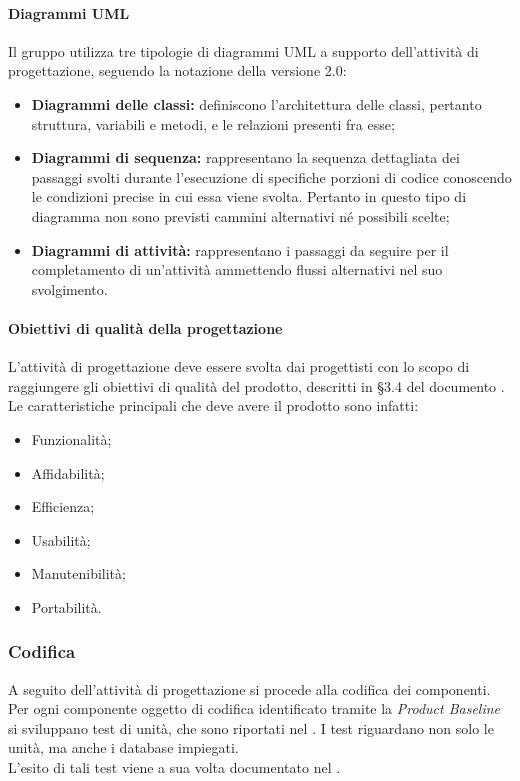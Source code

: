 \paragraph{Diagrammi UML}
Il gruppo \groupName{} utilizza tre tipologie di diagrammi UML a supporto dell'attivit\`a di progettazione, seguendo la notazione della versione 2.0:
\begin{itemize}
	\item \textbf{Diagrammi delle classi:} definiscono l'architettura delle classi, pertanto struttura, variabili e metodi, e le relazioni presenti fra esse;
	\item \textbf{Diagrammi di sequenza:} rappresentano la sequenza dettagliata dei passaggi svolti durante l'esecuzione di specifiche porzioni di codice conoscendo le condizioni precise in cui essa viene svolta. Pertanto in questo tipo di diagramma non sono previsti cammini alternativi n\'e possibili scelte;
	\item \textbf{Diagrammi di attivit\`a:} rappresentano i passaggi da seguire per il completamento di un'attivit\`a ammettendo flussi alternativi nel suo svolgimento.
\end{itemize}

\paragraph{Obiettivi di qualità della progettazione}
L'attività di progettazione deve essere svolta dai progettisti con lo scopo di raggiungere gli obiettivi di qualità del prodotto, descritti in §3.4 del documento \docNameVersionPdQ{}. Le caratteristiche principali che deve avere il prodotto sono infatti:
\begin{itemize}
	\item Funzionalità;
	\item Affidabilità;
	\item Efficienza;
	\item Usabilità;
	\item Manutenibilità;
	\item Portabilità.
\end{itemize}

\subsubsection{Codifica}
A seguito dell'attività di progettazione si procede alla codifica dei componenti.
Per ogni componente oggetto di codifica identificato tramite la \textit{Product Baseline} si sviluppano test di unità, che sono riportati nel \docNameVersionPdQ{}. I test riguardano non solo le unità, ma anche i database impiegati.\\
L'esito di tali test viene a sua volta documentato nel \docNameVersionPdQ{}.

